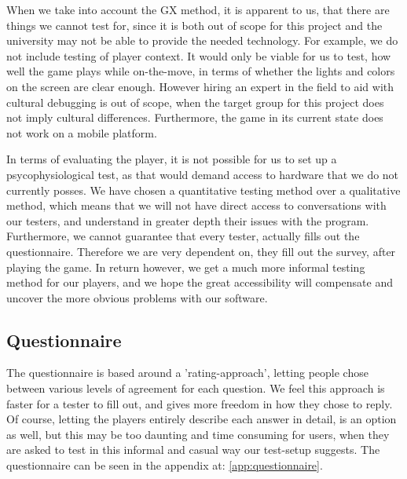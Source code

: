 When we take into account the GX method, it is apparent to us, that there are things we cannot test for, since it is both out of scope for this project and the university may not be able to provide the needed technology.
For example, we do not include testing of player context.
It would only be viable for us to test, how well the game plays while on-the-move, in terms of whether the lights and colors on the screen are clear enough.
However hiring an expert in the field to aid with cultural debugging is out of scope, when the target group for this project does not imply cultural differences.
Furthermore, the game in its current state does not work on a mobile platform.

In terms of evaluating the player, it is not possible for us to set up a psycophysiological test, as that would demand access to hardware that we do not currently posses. We have chosen a quantitative testing method over a qualitative method, which means that we will not have direct access to conversations with our testers, and understand in greater depth their issues with the program. Furthermore, we cannot guarantee that every tester, actually fills out the questionnaire. Therefore we are very dependent on, they fill out the survey, after playing the game. In return however, we get a much more informal testing method for our players, and we hope the great accessibility will compensate and uncover the more obvious problems with our software.

\subsection{Questionnaire}

The questionnaire is based around a 'rating-approach', letting people chose between various levels of agreement for each question. We feel this approach is faster for a tester to fill out, and gives more freedom in how they chose to reply. Of course, letting the players entirely describe each answer in detail, is an option as well, but this may be too daunting and time consuming for users, when they are asked to test in this informal and casual way our test-setup suggests. The questionnaire can be seen in the appendix at: \autoref{app:questionnaire}.